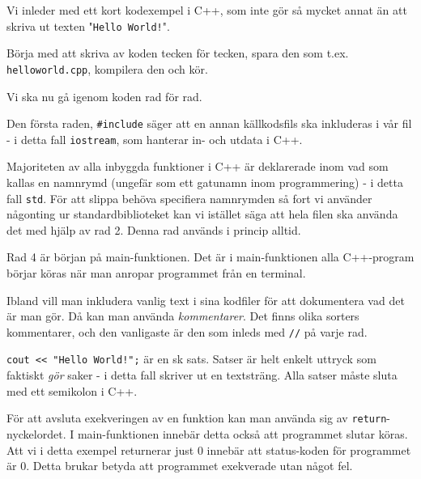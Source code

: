 Vi inleder med ett kort kodexempel i C++, som inte gör så mycket annat än att skriva ut texten "\texttt{Hello World!}".



Börja med att skriva av koden tecken för tecken, spara den som t.ex. \texttt{helloworld.cpp}, kompilera den och kör.

Vi ska nu gå igenom koden rad för rad.

Den första raden, \texttt{\#include} säger att en annan källkodsfils ska inkluderas i vår fil - i detta fall \texttt{iostream}, som hanterar in- och utdata i C++.

Majoriteten av alla inbyggda funktioner i C++ är deklarerade inom vad som kallas en namnrymd (ungefär som ett gatunamn inom programmering) - i detta fall \texttt{std}. För att slippa behöva specifiera namnrymden så fort vi använder någonting ur standardbiblioteket kan vi istället säga att hela filen ska använda det med hjälp av rad 2. Denna rad används i princip alltid.

Rad 4 är början på main-funktionen. Det är i main-funktionen alla C++-program börjar köras när man anropar programmet från en terminal.

Ibland vill man inkludera vanlig text i sina kodfiler för att dokumentera vad det är man gör. Då kan man använda \emph{kommentarer}. Det finns olika sorters kommentarer, och den vanligaste är den som inleds med \texttt{//} på varje rad.

\texttt{cout << "Hello World!";} är en sk sats. Satser är helt enkelt uttryck som faktiskt \emph{gör} saker - i detta fall skriver ut en textsträng. Alla satser måste sluta med ett semikolon i C++.

För att avsluta exekveringen av en funktion kan man använda sig av \texttt{return}-nyckelordet. I main-funktionen innebär detta också att programmet slutar köras. Att vi i detta exempel returnerar just 0 innebär att status-koden för programmet är 0. Detta brukar betyda att programmet exekverade utan något fel.
